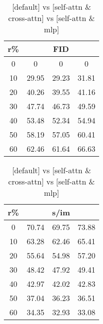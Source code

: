 \begin{table}[htp]
\caption{[default] vs [self-attn \& cross-attn] vs [self-attn \& mlp]}
\label{table:exp_1_2}
    \begin{minipage}{0.48\textwidth}
        \centering
        \begin{tabular}{|c||c|c|c|}
            \hline
            \multicolumn{1}{|c||}{r\%} & \multicolumn{3}{c|}{FID}\\
            \hline
            0 & 0 & 0 & 0 \\
            10 & 29.95 & 29.23 & 31.81 \\
            20 & 40.26 & 39.55 & 41.16 \\
            30 & 47.74 & 46.73 & 49.59 \\
            40 & 53.48 & 52.34 & 54.94 \\
            50 & 58.19 & 57.05 & 60.41 \\
            60 & 62.46 & 61.64 & 66.63 \\
            \hline
        \end{tabular}
    \end{minipage}
    \hfill
    \begin{minipage}{0.48\textwidth}
        \centering
        \begin{tabular}{|c||c|c|c|}
            \hline
            \multicolumn{1}{|c||}{r\%} & \multicolumn{3}{c|}{s/im}\\
            \hline
            0 & 70.74 & 69.75 & 73.88 \\
            10 & 63.28 & 62.46 & 65.41 \\
            20 & 55.64 & 54.98 & 57.20 \\
            30 & 48.42 & 47.92 & 49.41 \\
            40 & 42.97 & 42.02 & 42.83 \\
            50 & 37.04 & 36.23 & 36.51 \\
            60 & 34.35 & 32.93 & 33.08 \\
            \hline
        \end{tabular}
    \end{minipage}
\end{table}